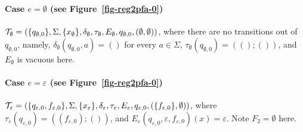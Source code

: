 \paragraph{Case $e =\emptyset$ (see Figure~\ref{fig-reg2pfa-0})} $\mathcal{T}_\emptyset = (\{q_{\emptyset, 0}\}, \Sigma, \{x_{\emptyset}\}, \delta_\emptyset, \tau_\emptyset, E_\emptyset, q_{\emptyset, 0}, (\emptyset, \emptyset))$, where there are no transitions out of $q_{\emptyset,0}$, namely, $\delta_\emptyset(q_{\emptyset, 0}, a) = ()$ for every $a \in \Sigma$, $\tau_\emptyset(q_{\emptyset, 0}) = ((); ())$, and $E_\emptyset$ is vacuous here.


\paragraph{Case $e = \varepsilon$ (see Figure~\ref{fig-reg2pfa-0})} $\mathcal{T}_\varepsilon = (\{q_{\varepsilon, 0}, f_{\varepsilon,0}\}, \Sigma, \{x_\varepsilon\}, \delta_\varepsilon, \tau_\varepsilon, E_\varepsilon, q_{\varepsilon,0}, (\{f_{\varepsilon,0}\}, \emptyset))$, 
%
where 
$\tau_\varepsilon(q_{\varepsilon,0}) = ((f_{\varepsilon,0}); ())$, %
and $E_\varepsilon(q_{\varepsilon,0}, \varepsilon, f_{\varepsilon,0})(x) = \varepsilon$. Note $F_2 = \emptyset$ here. 
		
